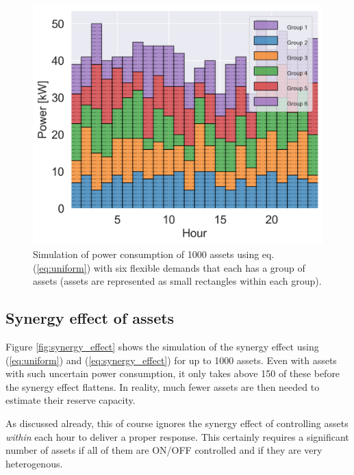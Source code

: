 \documentclass[lettersize,journal]{IEEEtran}
\begin{document}
\begin{figure}[!t]
    \centering
    \includegraphics[width=\columnwidth]{figures/assets2.png}
    \caption{Simulation of power consumption of 1000 assets using eq. (\ref{eq:uniform}) with six flexible demands that each has a group of assets (assets are represented as small rectangles within each group).}
    \label{fig:assets}
\end{figure}

\subsection{Synergy effect of assets}

Figure \ref{fig:synergy_effect} shows the simulation of the synergy effect using (\ref{eq:uniform}) and (\ref{eq:synergy_effect}) for up to 1000 assets. Even with assets with such uncertain power consumption, it only takes above 150 of these before the synergy effect flattens. In reality, much fewer assets are then needed to estimate their reserve capacity.

As discussed already, this of course ignores the synergy effect of controlling assets \textit{within} each hour to deliver a proper response. This certainly requires a significant number of assets if all of them are ON/OFF controlled and if they are very heterogenous.
\end{document}
